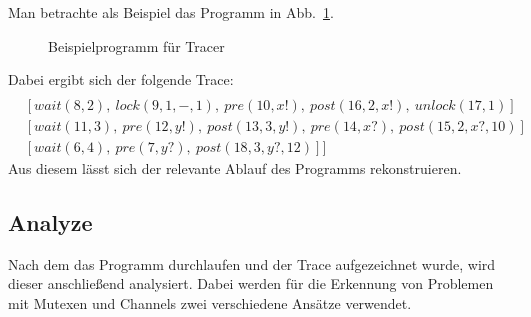 Man betrachte als Beispiel das Programm in Abb.~\ref{Chap:Tracer-Sec:Trace-Fig:Example}.\\
\begin{figure}[h]
  
  \caption{Beispielprogramm für Tracer}
  \label{Chap:Tracer-Sec:Trace-Fig:Example}
\end{figure}
Dabei ergibt sich der folgende Trace:
\begin{align*}
  [&[signal(1, 2),\ signal(2, 3),\ signal(3, 4),\ pre(4, a?, default),\ post(5, default)]\\
  &[wait(8, 2),\ lock(9, 1, -, 1),\ pre(10, x!),\ post(16, 2, x!),\ unlock(17, 1)]\\
  &[wait(11, 3),\ pre(12, y!),\ post(13, 3, y!),\ pre(14, x?),\ post(15, 2, x?, 10)]\\
  &[wait(6, 4),\ pre(7, y?),\ post(18, 3, y?, 12)]]
\end{align*}
Aus diesem lässt sich der relevante Ablauf des Programms rekonstruieren.

\subsection{Analyze}
Nach dem das Programm durchlaufen und der Trace aufgezeichnet wurde, 
wird dieser anschließend analysiert. Dabei werden für die Erkennung von 
Problemen mit Mutexen und Channels zwei verschiedene Ansätze verwendet.


